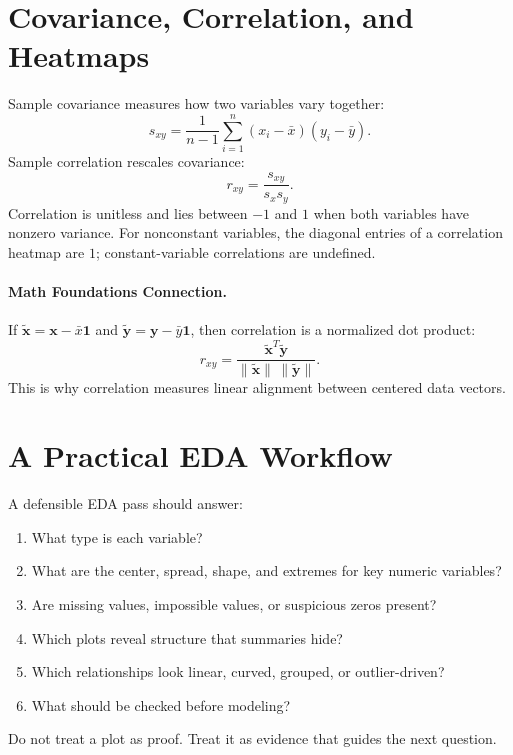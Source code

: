 {\section{Covariance, Correlation, and Heatmaps}

Sample covariance measures how two variables vary together:
\begin{equation}
  s_{xy}=\frac{1}{n-1}\sum_{i=1}^n (x_i-\bar{x})(y_i-\bar{y}).
  \label{eq:ch4-sample-covariance}
\end{equation}
Sample correlation rescales covariance:
\begin{equation}
  r_{xy}=\frac{s_{xy}}{s_xs_y}.
  \label{eq:ch4-sample-correlation}
\end{equation}
Correlation is unitless and lies between $-1$ and $1$ when both variables have nonzero variance.  For nonconstant variables, the diagonal entries of a correlation heatmap are $1$; constant-variable correlations are undefined.

\paragraph{Math Foundations Connection.}
If $\tilde{\mathbf{x}}=\mathbf{x}-\bar{x}\mathbf{1}$ and $\tilde{\mathbf{y}}=\mathbf{y}-\bar{y}\mathbf{1}$, then correlation is a normalized dot product:
\begin{equation}
  r_{xy}=\frac{\tilde{\mathbf{x}}^T\tilde{\mathbf{y}}}{\|\tilde{\mathbf{x}}\|\,\|\tilde{\mathbf{y}}\|}.
  \label{eq:ch4-correlation-centered-vectors}
\end{equation}
This is why correlation measures linear alignment between centered data vectors.

\section{A Practical EDA Workflow}

A defensible EDA pass should answer:
\begin{enumerate}
  \item What type is each variable?
  \item What are the center, spread, shape, and extremes for key numeric variables?
  \item Are missing values, impossible values, or suspicious zeros present?
  \item Which plots reveal structure that summaries hide?
  \item Which relationships look linear, curved, grouped, or outlier-driven?
  \item What should be checked before modeling?
\end{enumerate}
Do not treat a plot as proof.  Treat it as evidence that guides the next question.

}
